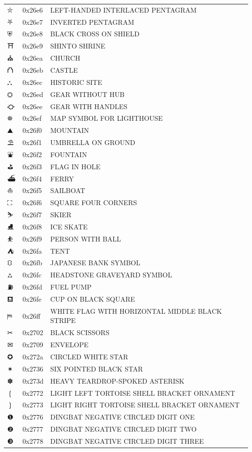 \documentclass[12pt, twoside]{article}
\begin{document}
\begin{longtable}{L{1.0cm} L{2.0cm} >{\footnotesize}L{10cm}}
$⛦$&0x26e6&LEFT-HANDED INTERLACED PENTAGRAM\\
$⛧$&0x26e7&INVERTED PENTAGRAM\\
$⛨$&0x26e8&BLACK CROSS ON SHIELD\\
$⛩$&0x26e9&SHINTO SHRINE\\
$⛪$&0x26ea&CHURCH\\
$⛫$&0x26eb&CASTLE\\
$⛬$&0x26ec&HISTORIC SITE\\
$⛭$&0x26ed&GEAR WITHOUT HUB\\
$⛮$&0x26ee&GEAR WITH HANDLES\\
$⛯$&0x26ef&MAP SYMBOL FOR LIGHTHOUSE\\
$⛰$&0x26f0&MOUNTAIN\\
$⛱$&0x26f1&UMBRELLA ON GROUND\\
$⛲$&0x26f2&FOUNTAIN\\
$⛳$&0x26f3&FLAG IN HOLE\\
$⛴$&0x26f4&FERRY\\
$⛵$&0x26f5&SAILBOAT\\
$⛶$&0x26f6&SQUARE FOUR CORNERS\\
$⛷$&0x26f7&SKIER\\
$⛸$&0x26f8&ICE SKATE\\
$⛹$&0x26f9&PERSON WITH BALL\\
$⛺$&0x26fa&TENT\\
$⛻$&0x26fb&JAPANESE BANK SYMBOL\\
$⛼$&0x26fc&HEADSTONE GRAVEYARD SYMBOL\\
$⛽$&0x26fd&FUEL PUMP\\
$⛾$&0x26fe&CUP ON BLACK SQUARE\\
$⛿$&0x26ff&WHITE FLAG WITH HORIZONTAL MIDDLE BLACK STRIPE\\
$✂$&0x2702&BLACK SCISSORS\\
$✉$&0x2709&ENVELOPE\\
$✪$&0x272a&CIRCLED WHITE STAR\\
$✶$&0x2736&SIX POINTED BLACK STAR\\
$✽$&0x273d&HEAVY TEARDROP-SPOKED ASTERISK\\
$❲$&0x2772&LIGHT LEFT TORTOISE SHELL BRACKET ORNAMENT\\
$❳$&0x2773&LIGHT RIGHT TORTOISE SHELL BRACKET ORNAMENT\\
$❶$&0x2776&DINGBAT NEGATIVE CIRCLED DIGIT ONE\\
$❷$&0x2777&DINGBAT NEGATIVE CIRCLED DIGIT TWO\\
$❸$&0x2778&DINGBAT NEGATIVE CIRCLED DIGIT THREE\\

\end{longtable}
\end{document}
